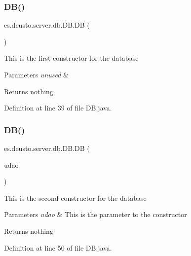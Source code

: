 \subsubsection{\texorpdfstring{D\+B()}{DB()}\hspace{0.1cm}{\footnotesize\ttfamily [1/2]}}
{\footnotesize\ttfamily es.\+deusto.\+server.\+db.\+D\+B.\+DB (\begin{DoxyParamCaption}{ }\end{DoxyParamCaption})}

This is the first constructor for the database 
\begin{DoxyParams}{Parameters}
{\em unused} & \\
\hline
\end{DoxyParams}
\begin{DoxyReturn}{Returns}
nothing 
\end{DoxyReturn}


Definition at line 39 of file D\+B.\+java.

\mbox{\label{classes_1_1deusto_1_1server_1_1db_1_1_d_b_abcfd35c624e742697bc2b1d1df8cc92a}} 
\subsubsection{\texorpdfstring{D\+B()}{DB()}\hspace{0.1cm}{\footnotesize\ttfamily [2/2]}}
{\footnotesize\ttfamily es.\+deusto.\+server.\+db.\+D\+B.\+DB (\begin{DoxyParamCaption}\item[{\hyperlink{interfacees_1_1deusto_1_1server_1_1db_1_1dao_1_1_i_d_a_o}{I\+D\+AO}}]{udao }\end{DoxyParamCaption})}

This is the second constructor for the database 
\begin{DoxyParams}{Parameters}
{\em udao} & This is the parameter to the constructor \\
\hline
\end{DoxyParams}
\begin{DoxyReturn}{Returns}
nothing 
\end{DoxyReturn}


Definition at line 50 of file D\+B.\+java.



